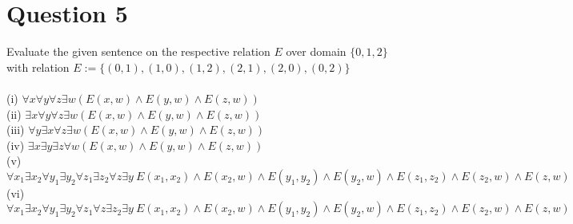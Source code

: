 \documentclass[12pt]{fphw}
\begin{document}
\section*{Question 5}

\begin{problem}
  Evaluate the given sentence on the respective relation $E$ over domain $\{0,1,2\}$ with relation $E := \{(0,1),(1,0),(1,2),(2,1),(2,0),(0,2)\}$\\ \\
  (i) $\forall x \forall y \forall z \exists w (E(x,w) \wedge E(y,w) \wedge E(z,w))$ \\
  (ii) $\exists x \forall y \forall z \exists w (E(x,w) \wedge E(y,w) \wedge E(z,w))$ \\
  (iii) $\forall y \exists x \forall z \exists w (E(x,w) \wedge E(y,w) \wedge E(z,w))$ \\
  (iv) $\exists x \exists y \exists z \forall w (E(x,w) \wedge E(y,w) \wedge E(z,w))$ \\
  (v) $\forall x_1 \exists x_2 \forall y_1 \exists y_2 \forall z_1 \exists z_2 \forall z \exists y \ E(x_1, x_2) \wedge E(x_2, w) \wedge E(y_1, y_2) \wedge E(y_2, w) \wedge E(z_1, z_2) \wedge E(z_2, w) \wedge E(z,w)$ \\
  (vi) $\forall x_1 \exists x_2 \forall y_1 \exists y_2 \forall z_1 \forall z \exists z_2 \exists y \ E(x_1, x_2) \wedge E(x_2, w) \wedge E(y_1, y_2) \wedge E(y_2, w) \wedge E(z_1, z_2) \wedge E(z_2, w) \wedge E(z,w)$
\end{problem}
\end{document}
